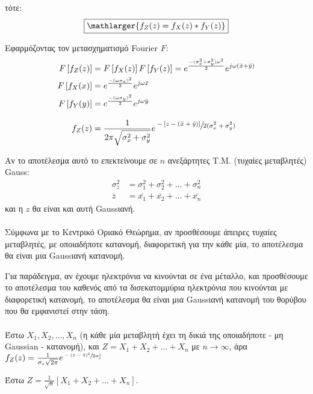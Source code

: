 \documentclass[11pt,a4paper,notitlepage,fleqn,final]{article}
\begin{document}
τότε:
\[
\boxed{
\mathlarger{f_Z(z) = f_X(z) * f_Y(z)}
}
\]

Εφαρμόζοντας τον μετασχηματισμό Fourier \( F \):
\begin{align*}
	F\left[f_Z(z)\right] &= F\left[f_X(z)\right]
	F\left[f_Y(z)\right] = 
	e^{\frac{-(\sigma_x^2+\sigma_y^2)\omega^2}{2}}
	e^{j\omega (\bar x+\bar y)}
	\\
	F\left[f_X(x)\right] &= e^{\frac{-(\omega\sigma_x)^2}{2}}
	e^{j\omega \bar x}
	\\
	F\left[f_Y(y)\right] &= e^{\frac{-(\omega \sigma_y)^2}{2}}
	e^{j\omega \bar y}
	\\[2ex]
	f_Z(z) &= \frac{1}{2\pi\sqrt{\sigma_x^2+\sigma_y^2}}
	e^{\displaystyle \sfrac{
		-\left[z-(\bar x+\bar y)\right]
	}{2(\sigma_x^2+\sigma_y^2)}
		}
\end{align*}

Αν το αποτέλεσμα αυτό το επεκτείνουμε σε \( n \) ανεξάρτητες Τ.Μ.
(τυχαίες μεταβλητές) Gauss:
\begin{align*}
	\sigma_z^2 &= \sigma_1^2+\sigma_2^2+\dots+\sigma_n^2 \\
	\bar z &= \bar{x_1} + \bar{x_2} + \dots + \bar{x_n}
\end{align*}
και η \( z \) θα είναι και αυτή Gaussιανή.

\paragraph{}
Σύμφωνα με το Κεντρικό Οριακό Θεώρημα, αν προσθέσουμε άπειρες τυχαίες
μεταβλητές, με οποιαδήποτε κατανομή, διαφορετική για την κάθε μία, το
αποτέλεσμα θα είναι μια Gaussιανή κατανομή.

Για παράδειγμα, αν έχουμε ηλεκτρόνια να κινούνται σε ένα μέταλλο, και
προσθέσουμε το αποτέλεσμα του καθενός από τα δισεκατομμύρια ηλεκτρόνια
που κινούνται με διαφορετική κατανομή, το αποτέλεσμα θα είναι μια
Gaussιανή κατανομή του θορύβου που θα εμφανιστεί στην τάση.

\paragraph{}
Έστω \( X_1,X_2,\dots,X_n \) (η κάθε μία μεταβλητή έχει τη δικιά της
οποιαδήποτε - μη Gaussian - κατανομή), και \( Z = X_1+X_2+\dots+X_n \) με
\( n\to \infty \), άρα \( f_Z(z)
= \frac{1}{\sigma_z\sqrt{2\pi}} e^{\sfrac{-(z-\bar z)^2}{2\sigma_2^2} }
\)

Έστω
\( Z = \frac{1}{\sqrt{n}} \left[X_1+X_2+\dots+X_n\right]\).
\end{document}
